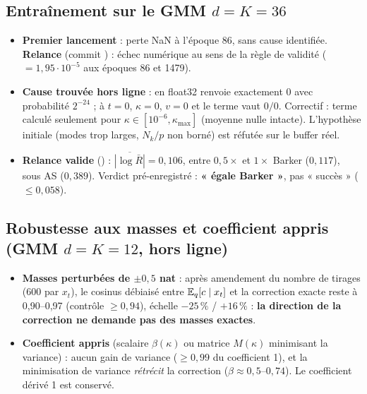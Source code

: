 \subsection{Entraînement sur le GMM $d=K=36$}
\begin{itemize}
  \item \textbf{Premier lancement} : perte NaN à l'époque 86, sans cause identifiée. \textbf{Relance} (commit ) : échec numérique au sens de la règle de validité ( $=1{,}95\cdot10^{-5}$ aux époques 86 et 1479).
  \item \textbf{Cause trouvée hors ligne} :  en float32 renvoie exactement $0$ avec probabilité $2^{-24}$ ; à $t=0$, $\kappa=0$, $v=0$ et le terme vaut $0/0$. Correctif : terme calculé seulement pour $\kappa\in[10^{-6},\kappa_{\max}]$ (moyenne nulle intacte). L'hypothèse initiale (modes trop larges, $N_k/p$ non borné) est réfutée sur le buffer réel.
  \item \textbf{Relance valide} () : $\overline{|\log\bar R|}=0{,}106$, entre $0{,}5\times$ et $1\times$ Barker ($0{,}117$), sous AS ($0{,}389$). Verdict pré-enregistré : \textbf{« égale Barker »}, pas « succès » ($\le0{,}058$).
\end{itemize}

\subsection{Robustesse aux masses et coefficient appris (GMM $d=K=12$, hors ligne)}
\begin{itemize}
  \item \textbf{Masses perturbées de $\pm0{,}5$ nat} : après amendement du nombre de tirages (600 par $x_t$), le cosinus débiaisé entre $\mathbb{E}_q[c\mid x_t]$ et la correction exacte reste à 0,90--0,97 (contrôle $\ge0{,}94$), échelle $-25\,\%$ / $+16\,\%$ : \textbf{la direction de la correction ne demande pas des masses exactes}.
  \item \textbf{Coefficient appris} (scalaire $\beta(\kappa)$ ou matrice $M(\kappa)$ minimisant la variance) : aucun gain de variance ($\ge0{,}99$ du coefficient 1), et la minimisation de variance \emph{rétrécit} la correction ($\beta\approx0{,}5$--$0{,}74$). Le coefficient dérivé 1 est conservé.
\end{itemize}

